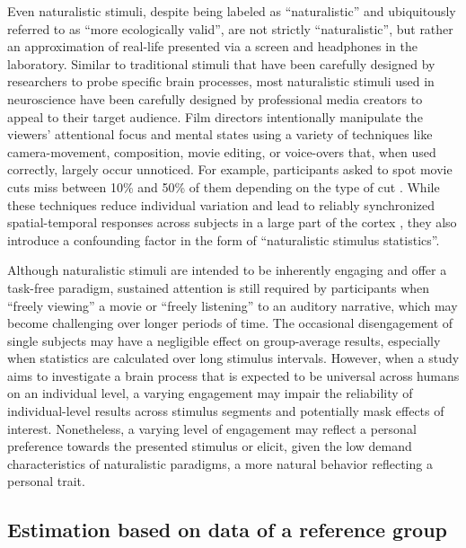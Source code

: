 %
Even naturalistic stimuli, despite being labeled as ``naturalistic'' and
ubiquitously referred to as ``more ecologically valid'', are not strictly
``naturalistic'', but rather an approximation of real-life presented via a
screen and headphones in the laboratory.
Similar to traditional stimuli that have been carefully designed by researchers
to probe specific brain processes, most naturalistic stimuli used in
neuroscience have been carefully designed by professional media creators to
appeal to their target audience.
%
Film directors intentionally manipulate the viewers' attentional focus and
mental states using a variety of techniques like camera-movement, composition,
movie editing, or voice-overs \citep{brown2012cinematography,
dancyger2011film-technique, katz1991film, mercado2011filmmakers} that, when used
correctly, largely occur unnoticed.
%
For example, participants asked to spot movie cuts miss between 10\% and 50\% of
them depending on the type of cut \citep{smith2008edit}.
%
While these techniques reduce individual variation and lead to reliably
synchronized spatial-temporal responses across subjects in a large part of the
cortex \citep{hasson2008neurocinematics}, they also introduce a confounding
factor in the form of ``naturalistic stimulus statistics''.

%
Although naturalistic stimuli are intended to be inherently engaging and offer a
task-free paradigm, sustained attention is still required by participants when
``freely viewing'' a movie or ``freely listening'' to an auditory narrative,
which may become challenging over longer periods of time.
%
The occasional disengagement of single subjects may have a negligible effect on
group-average results, especially when statistics are calculated over long
stimulus intervals.
%
However, when a study aims to investigate a brain process that is expected to be
universal across humans on an individual level, a varying engagement may impair
the reliability of individual-level results across stimulus segments and
potentially mask effects of interest.
%
Nonetheless, a varying level of engagement may reflect a personal preference
towards the presented stimulus or elicit, given the low demand characteristics
\citep[cf.][]{orne1962social} of naturalistic paradigms, a more natural behavior
reflecting a personal trait.


\subsection{Estimation based on data of a reference group}


